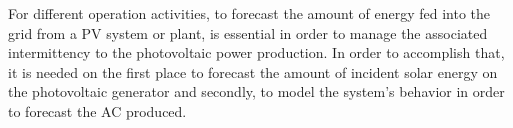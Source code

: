 
For different operation activities, to forecast the amount of energy fed into the grid from a PV system or plant, is essential in order to manage the associated intermittency to the photovoltaic power production. In order to accomplish that, it is needed on the first place to forecast the amount of incident solar energy on the photovoltaic generator and secondly, to model the system's behavior in order to forecast the AC produced.   




